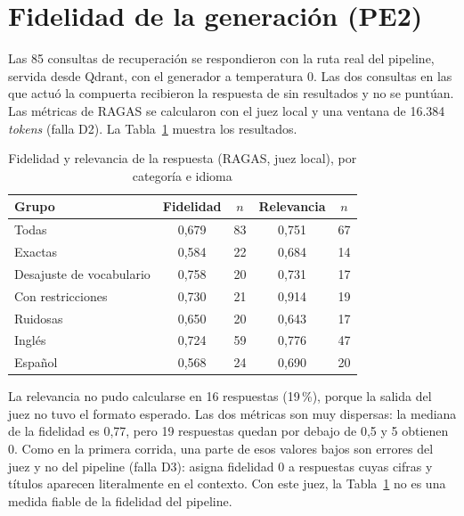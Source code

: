 \section{Fidelidad de la generación (PE2)}
\label{sec:res-pe2}

Las 85 consultas de recuperación se respondieron con la ruta real del pipeline, servida desde Qdrant, con el generador a temperatura 0. Las dos consultas en las que actuó la compuerta recibieron la respuesta de sin resultados y no se puntúan. Las métricas de RAGAS se calcularon con el juez local y una ventana de 16.384 \textit{tokens} (falla D2). La Tabla~\ref{tab:res-pe2} muestra los resultados.

\begin{table}[htbp!]
    \centering
    \caption{Fidelidad y relevancia de la respuesta (RAGAS, juez local), por categoría e idioma}
    \label{tab:res-pe2}
    \begin{tabular}{|l|c|c|c|c|}
        \hline
        \textbf{Grupo} & \textbf{Fidelidad} & \textbf{$n$} & \textbf{Relevancia} & \textbf{$n$} \\
        \hline
        Todas & 0{,}679 & 83 & 0{,}751 & 67 \\
        \hline
        Exactas & 0{,}584 & 22 & 0{,}684 & 14 \\
        \hline
        Desajuste de vocabulario & 0{,}758 & 20 & 0{,}731 & 17 \\
        \hline
        Con restricciones & 0{,}730 & 21 & 0{,}914 & 19 \\
        \hline
        Ruidosas & 0{,}650 & 20 & 0{,}643 & 17 \\
        \hline
        Inglés & 0{,}724 & 59 & 0{,}776 & 47 \\
        \hline
        Español & 0{,}568 & 24 & 0{,}690 & 20 \\
        \hline
    \end{tabular}
\end{table}

La relevancia no pudo calcularse en 16 respuestas (19\,\%), porque la salida del juez no tuvo el formato esperado. Las dos métricas son muy dispersas: la mediana de la fidelidad es 0,77, pero 19 respuestas quedan por debajo de 0,5 y 5 obtienen 0. Como en la primera corrida, una parte de esos valores bajos son errores del juez y no del pipeline (falla D3): asigna fidelidad 0 a respuestas cuyas cifras y títulos aparecen literalmente en el contexto. Con este juez, la Tabla~\ref{tab:res-pe2} no es una medida fiable de la fidelidad del pipeline.

